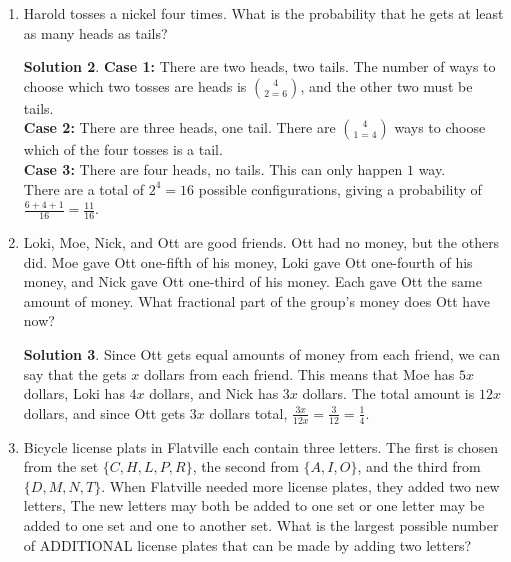 \documentclass{article}
\theoremstyle{definition}
\newtheorem*{solution}{Solution}
\begin{document}
\begin{multicols}{2}
\begin{enumerate}
\begin{solution}
                So, our answer is $1$.
            \end{solution}
        \item Harold tosses a nickel four times.
            What is the probability that he gets at least as many heads as tails?
            \begin{solution}
                \textbf{Case 1:} There are two heads, two tails.
                The number of ways to choose which two tosses are heads is ${4}\choose{2} = 6$, and the other two must be tails. \\
                \textbf{Case 2:} There are three heads, one tail.
                There are ${4}\choose{1} = 4$ ways to choose which of the four tosses is a tail. \\
                \textbf{Case 3:} There are four heads, no tails.
                This can only happen $1$ way. \\
                There are a total of $2^4 = 16$ possible configurations, giving a probability of $\frac{6 + 4 + 1}{16} = \frac{11}{16}$.
            \end{solution}
        \item Loki, Moe, Nick, and Ott are good friends.
            Ott had no money, but the others did.
            Moe gave Ott one-fifth of his money, Loki gave Ott one-fourth of his money, and Nick gave Ott one-third of his money.
            Each gave Ott the same amount of money.
            What fractional part of the group's money does Ott have now?
            \begin{solution}
                Since Ott gets equal amounts of money from each friend, we can say that the gets $x$ dollars from each friend.
                This means that Moe has $5x$ dollars, Loki has $4x$ dollars, and Nick has $3x$ dollars.
                The total amount is $12x$ dollars, and since Ott gets $3x$ dollars total, $\frac{3x}{12x} = \frac{3}{12} = \frac{1}{4}$.
            \end{solution}
        \item Bicycle license plats in Flatville each contain three letters.
            The first is chosen from the set $\{C,H,L,P,R\}$, the second from $\{A,I,O\}$, and the third from $\{D,M,N,T\}$.
            When Flatville needed more license plates, they added two new letters, The new letters may both be added to one set or one letter may be added to one set and one to another set.
            What is the largest possible number of ADDITIONAL license plates that can be made by adding two letters?

\end{enumerate}
\end{multicols}
\end{document}
